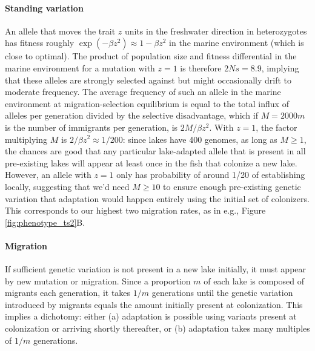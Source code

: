 \documentclass{article}
\begin{document}
\paragraph{Standing variation}
An allele that moves the trait $z$ units in the freshwater direction in heterozygotes has fitness roughly $\exp(-\beta z^2) \approx 1 - \beta z^2$ in the marine environment (which is close to optimal). The product of population size and fitness differential in the marine environment for a mutation with $z=1$ is therefore $2Ns = 8.9$, implying that these alleles are strongly selected against but might occasionally drift to moderate frequency. The average frequency of such an allele in the marine environment at migration-selection equilibrium is equal to the total influx of alleles per generation divided by the selective disadvantage, which if $M = 2000 m$ is the number of immigrants per generation, is $2 M / \beta z^2$. With $z=1$, the factor multiplying $M$ is $2/\beta z^2 \approx 1/200$: since lakes have 400 genomes, as long as $M \ge 1$, the chances are good that any particular lake-adapted allele that is present in all pre-existing lakes will appear at least once in the fish that colonize a new lake. However, an allele with $z=1$ only has probability of around 1/20 of establishing locally, suggesting that we'd need $M \ge 10$ to ensure enough pre-existing genetic variation that adaptation would happen entirely using the initial set of colonizers. This corresponds to our highest two migration rates, as in e.g., Figure \ref{fig:phenotype_ts2}B.

\paragraph{Migration}
If sufficient genetic variation is not present in a new lake initially, it must appear by new mutation or migration. Since a proportion $m$ of each lake is composed of migrants each generation, it takes $1/m$ generations until the genetic variation introduced by migrants equals the amount initially present at colonization. This implies a dichotomy: either (a) adaptation is possible using variants present at colonization or arriving shortly thereafter, or (b) adaptation takes many multiples of $1/m$ generations.
\end{document}
